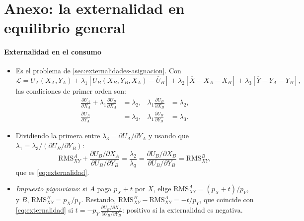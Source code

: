 \documentclass[11pt]{article}
\begin{document}
\section{Anexo: la externalidad en equilibrio general}\label{anexo:externalidad-eg}

\paragraph{Externalidad en el consumo}
\begin{itemize}
\item Es el problema de \ref{sec:externalidades-asignacion}. Con
  $$\mathcal{L}=U_A(X_A,Y_A)+\lambda_1[U_B(X_B,Y_B,X_A)-\overline{U}_B]+\lambda_2[\overline{X}-X_A-X_B]+\lambda_3[\overline{Y}-Y_A-Y_B],$$
  las condiciones de primer orden son:
  \begin{align*}
  \frac{\partial U_A}{\partial X_A}+\lambda_1\frac{\partial U_B}{\partial X_A}&=\lambda_2, & \lambda_1\frac{\partial U_B}{\partial X_B}&=\lambda_2,\\
  \frac{\partial U_A}{\partial Y_A}&=\lambda_3, & \lambda_1\frac{\partial U_B}{\partial Y_B}&=\lambda_3.
  \end{align*}
\item Dividiendo la primera entre $\lambda_3=\partial U_A/\partial Y_A$ y usando que $\lambda_1=\lambda_3/(\partial U_B/\partial Y_B)$:
  $$\mathrm{RMS}^A_{XY}+\frac{\partial U_B/\partial X_A}{\partial U_B/\partial Y_B}=\frac{\lambda_2}{\lambda_3}=\frac{\partial U_B/\partial X_B}{\partial U_B/\partial Y_B}=\mathrm{RMS}^B_{XY},$$
  que es \eqref{eq:externalidad}.~\findemo
\item \emph{Impuesto pigouviano}: si $A$ paga $p_X+t$ por $X$, elige $\mathrm{RMS}^A_{XY}=(p_X+t)/p_Y$, y $B$, $\mathrm{RMS}^B_{XY}=p_X/p_Y$. Restando, $\mathrm{RMS}^B_{XY}-\mathrm{RMS}^A_{XY}=-t/p_Y$, que coincide con \eqref{eq:externalidad} si $t=-p_Y\,\frac{\partial U_B/\partial X_A}{\partial U_B/\partial Y_B}$: positivo si la externalidad es negativa.
\end{itemize}
\end{document}
